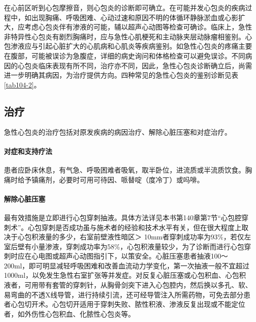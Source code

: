在心前区听到心包摩擦音，则心包炎的诊断即可确立。在可能并发心包炎的疾病过程中，如出现胸痛、呼吸困难、心动过速和原因不明的体循环静脉淤血或心影扩大，应考虑心包炎伴有渗液的可能，辅以超声心动图等检查可确诊。临床上，急性非特异性心包炎有剧烈胸痛时，应与急性心肌梗死和主动脉夹层动脉瘤相鉴别。心包渗液应与引起心脏扩大的心肌病和心肌炎等疾病鉴别。如急性心包炎的疼痛主要在腹部，可能被误诊为急腹症，详细的病史询问和体格检查可以避免误诊。不同病因的心包炎临床表现有所不同，治疗亦不同，因此，急性心包炎诊断确立后，尚需进一步明确其病因，为治疗提供方向。四种常见的急性心包炎的鉴别诊断见表\ref{tab104-2}。

\subsection{治疗}

急性心包炎的治疗包括对原发疾病的病因治疗、解除心脏压塞和对症治疗。

\paragraph{对症和支持疗法}

患者应卧床休息，有气急、呼吸困难者吸氧，取半卧位，进流质或半流质饮食。胸痛时给予镇痛剂，必要时可用可待因、哌替啶（度冷丁）或吗啡。

\paragraph{解除心脏压塞}

最有效措施是立即进行心包穿刺抽液。具体方法详见本书第140章第7节“心包腔穿刺术”。心包穿刺是否成功虽与施术者的经验和技术水平有关，但在很大程度上取决于心包积液量的多少，右室前壁液性暗区＞
10mm者穿刺成功率为93\%，若仅左室后壁有小量渗液，穿刺成功率为58\%，心包积液量较少，为了诊断而进行心包穿刺时应在心电图或超声心动图指引下，以策安全。心脏压塞患者抽液100～200ml，即可明显减轻呼吸困难和改善血流动力学变化，第一次抽液一般不宜超过1000ml，以免发生急性右室扩张等并发症。对反复心脏压塞或心包积血、心包积液者，可用带有套管的穿刺针，从胸骨剑突下进入心包腔内，然后换以多孔、软、易弯曲的不透X线导管，进行持续引流，还可经导管注入所需药物，可免去部分患者心包切开术。心包切开适用于穿刺失败、脓性积液、渗液反复出现或不能定位者，如外伤性心包积血、化脓性心包炎等。

